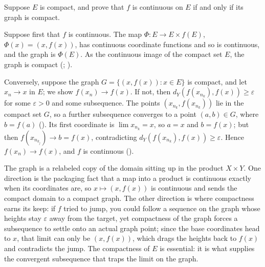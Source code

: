 \documentclass[main.tex]{subfiles}
\begin{document}
Suppose $E$ is compact, and prove that $f$ is continuous on $E$ if and only if its graph is compact.
\begin{SolutionBlue}
Suppose first that $f$ is continuous. The map $\Phi : E \to E \times f(E)$, $\Phi(x) = (x, f(x))$, has continuous coordinate functions and so is continuous, and the graph is $\Phi(E)$. As the continuous image of the compact set $E$, the graph is compact (; ).

Conversely, suppose the graph $G = \{(x, f(x)) : x \in E\}$ is compact, and let $x_{n} \to x$ in $E$; we show $f(x_{n}) \to f(x)$. If not, then $d_{Y}(f(x_{n_{k}}), f(x)) \ge \varepsilon$ for some $\varepsilon > 0$ and some subsequence. The points $(x_{n_{k}}, f(x_{n_{k}}))$ lie in the compact set $G$, so a further subsequence converges to a point $(a, b) \in G$, where $b = f(a)$ (). Its first coordinate is $\lim x_{n_{k}} = x$, so $a = x$ and $b = f(x)$; but then $f(x_{n_{k_{j}}}) \to b = f(x)$, contradicting $d_{Y}(f(x_{n_{k}}), f(x)) \ge \varepsilon$. Hence $f(x_{n}) \to f(x)$, and $f$ is continuous ().
\end{SolutionBlue}
\begin{Reflection}
The graph is a relabeled copy of the domain sitting up in the product $X \times Y$. One direction is the packaging fact that a map into a product is continuous exactly when its coordinates are, so $x \mapsto (x, f(x))$ is continuous and sends the compact domain to a compact graph. The other direction is where compactness earns its keep: if $f$ tried to jump, you could follow a sequence on the graph whose heights stay $\varepsilon$ away from the target, yet compactness of the graph forces a subsequence to settle onto an actual graph point; since the base coordinates head to $x$, that limit can only be $(x, f(x))$, which drags the heights back to $f(x)$ and contradicts the jump. The compactness of $E$ is essential: it is what supplies the convergent subsequence that traps the limit on the graph.
\end{Reflection}
\end{document}
